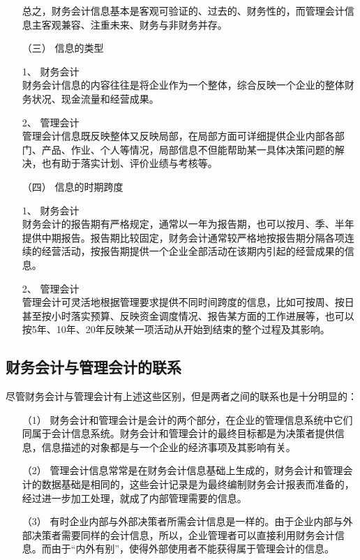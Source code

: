 \begin{enumerate}
					总之，财务会计信息基本是客观可验证的、过去的、财务性的，而管理会计信息主客观兼容、注重未来、财务与非财务并存。
			\item[（三）] 信息的类型
				\item[1、] 财务会计 \\
					财务会计信息的内容往往是将企业作为一个整体，综合反映一个企业的整体财务状况、现金流量和经营成果。
				\item[2、] 管理会计 \\
					管理会计信息既反映整体又反映局部，在局部方面可详细提供企业内部各部门、产品、作业、个人等情况，局部信息不但能帮助某一具体决策问题的解决，也有助于落实计划、评价业绩与考核等。
			\item[（四）] 信息的时期跨度
				\item[1、] 财务会计 \\
					财务会计的报告期有严格规定，通常以一年为报告期，也可以按月、季、半年提供中期报告。报告期比较固定，财务会计通常较严格地按报告期分隔各项连续的经营活动，按报告期提供一个企业全部活动在该期内引起的经营成果的信息。
				\item[2、] 管理会计 \\
					管理会计可灵活地根据管理要求提供不同时间跨度的信息，比如可按周、按日甚至按小时落实预算、反映资金调度情况、报告某方面的工作进展等，也可以按5年、10年、20年反映某一项活动从开始到结束的整个过程及其影响。
		\end{enumerate}

		\subsection{财务会计与管理会计的联系}
			尽管财务会计与管理会计有上述这些区别，但是两者之间的联系也是十分明显的：

			\begin{enumerate}
				\item[（1）] 财务会计和管理会计是会计的两个部分，在企业的管理信息系统中它们同属于会计信息系统。财务会计和管理会计的最终目标都是为决策者提供信息，信息描述的对象都是与一个企业的经济事项及其影响有关。
				\item[（2）] 管理会计信息常常是在财务会计信息基础上生成的，财务会计和管理会计的数据基础是相同的，这些会计记录是为最终编制财务会计报表而准备的，经过进一步加工处理，就成了内部管理需要的信息。
				\item[（3）] 有时企业内部与外部决策者所需会计信息是一样的。由于企业内部与外部决策者需要同样的会计信息，所以，企业管理者可以直接利用财务会计信息。而由于“内外有别”，使得外部使用者不能获得属于管理会计的信息。
			\end{enumerate}
			
